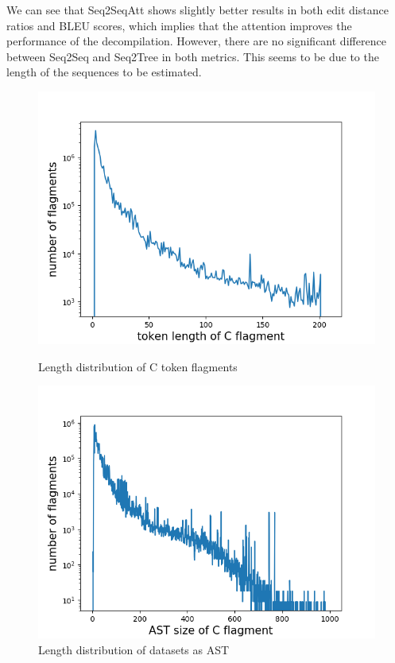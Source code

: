 \documentclass[senior,final,11pt]{iscs-thesis}
\begin{document}
We can see that Seq2SeqAtt shows slightly better results in both edit distance ratios and BLEU scores,
 which implies that the attention improves the performance of the decompilation.
However, there are no significant difference between Seq2Seq and Seq2Tree in both metrics.
This seems to be due to the length of the sequences to be estimated.

\begin{figure}[]
	\includegraphics[width=12cm]{c_lens.png}
	\caption{Length distribution of C token flagments}
	\label{fig:csizes}
	\includegraphics[width=12cm]{ast_lens.png}
	\caption{Length distribution of datasets as AST}
	\label{fig:astsizes}
\end{figure}
\end{document}
